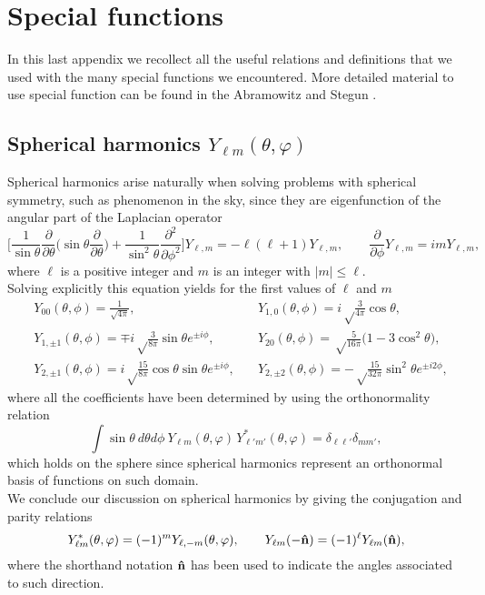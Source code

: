 \chapter{Special functions}
\label{app:special-functions}
In this last appendix we recollect all the useful relations and definitions that we used with the many special functions we encountered. More detailed material to use special function can be found in the Abramowitz and Stegun \cite{abramowitz+stegun}.

\section{Spherical harmonics \(Y_{\ell m}(\theta,\varphi)\)}
\label{app:spherical-harmonics}
Spherical harmonics arise naturally when solving problems with spherical symmetry, such as phenomenon in the sky, since they are eigenfunction of the angular part of the Laplacian operator 
$$
\Bigg[\frac{1}{\sin\theta}\frac{\partial}{\partial \theta}\bigg(\sin\theta\frac{\partial}{\partial\theta}\bigg)+\frac{1}{\sin^2\theta}\frac{\partial^2}{\partial\phi^2}\Bigg]Y_{\ell,m}=-\ell(\ell+1)Y_{\ell,m},\qquad \frac{\partial}{\partial\phi}Y_{\ell,m}=im Y_{\ell,m},$$
where $\ell$ is a positive integer and $m$ is an integer with $|m|\leq \ell$.\\
Solving explicitly this equation yields for the first values of $\ell$ and $m$
\begin{align*}
&Y_{00}(\theta,\phi)=\frac{1}{\sqrt{4\pi}}, &Y_{1,0}(\theta,\phi)=i\sqrt\frac{3}{4\pi}\cos{\theta},\\ &Y_{1,\pm1}(\theta,\phi)=\mp i\sqrt\frac{3}{8\pi}\sin\theta e^{\pm i\phi},\quad
&Y_{20}(\theta,\phi)=\sqrt\frac{5}{16\pi}\big(1-3\cos^2\theta\big), \\ &Y_{2,\pm1}(\theta,\phi)=i\sqrt\frac{15}{8\pi}\cos{\theta}\sin\theta e^{\pm i\phi},\quad &Y_{2,\pm2}(\theta,\phi)=-\sqrt\frac{15}{32\pi}\sin^2\theta e^{\pm i2\phi},
\end{align*}
where all the coefficients have been determined by using the orthonormality relation
\[
\int\sin\theta\ d\theta d\phi\ Y_{\ell m}(\theta,\varphi)\,Y^*_{\ell' m'}(\theta,\varphi)
=\delta_{\ell\ell'}\delta_{mm'},
\]
which holds on the sphere since spherical harmonics represent an orthonormal basis of functions on such domain.\\
We conclude our discussion on spherical harmonics by giving the conjugation and parity relations  
\[
Y_{\ell m}^*(\theta,\varphi)=(-1)^m Y_{\ell,-m}(\theta,\varphi),\qquad
Y_{\ell m}(-\mathbf{\hat{n}})=(-1)^\ell Y_{\ell m}(\mathbf{\hat{n}}),
\]
where the shorthand notation $\mathbf{\hat{n}}$ has been used to indicate the angles associated to such direction.


